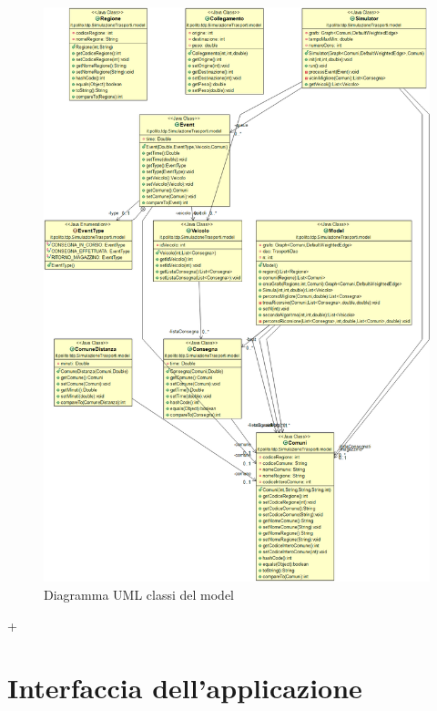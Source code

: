 \documentclass[a4paper,12pt]{report}
\begin{document}
\begin{figure}[h]
\begin{center}
\includegraphics[width=0.6\paperwidth]{Images/Diagramma.png} 
\caption{Diagramma UML classi del model}  
\end{center}
\end{figure}
+

\chapter{Interfaccia dell'applicazione}
\end{document}
